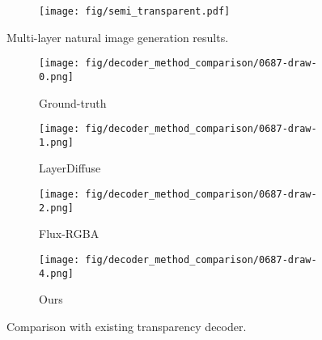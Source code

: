 \begin{figure}[!t]
\begin{minipage}[!t]{1\linewidth}
    \begin{subfigure}[b]{1\textwidth}
    \centering
\texttt{[image: fig/semi\_transparent.pdf]}
\vspace{-2mm}
\end{subfigure}
\vspace{-6mm}
\caption{Multi-layer natural image generation results.}
\label{fig:semi_tran}
\vspace{3mm}
\end{minipage}
\begin{minipage}[!t]{1\linewidth}
\begin{minipage}[!t]{0.25\linewidth}
    \begin{subfigure}[b]{1\textwidth}
    \centering
    \texttt{[image: fig/decoder\_method\_comparison/0687-draw-0.png]}
    \caption{\footnotesize{Ground-truth}}
    \end{subfigure}
\end{minipage}%
\begin{minipage}[!t]{0.25\linewidth}
    \begin{subfigure}[b]{1\textwidth}
    \centering
    \texttt{[image: fig/decoder\_method\_comparison/0687-draw-1.png]}
    \caption{\footnotesize{LayerDiffuse}}
    \end{subfigure}
\end{minipage}%
\begin{minipage}[!t]{0.25\linewidth}
    \begin{subfigure}[b]{1\textwidth}
    \centering
    \texttt{[image: fig/decoder\_method\_comparison/0687-draw-2.png]}
    \caption{\footnotesize{Flux-RGBA}}
    \end{subfigure}
\end{minipage}%
\begin{minipage}[!t]{0.25\linewidth}
    \begin{subfigure}[b]{1\textwidth}
    \centering
    \texttt{[image: fig/decoder\_method\_comparison/0687-draw-4.png]}
    \caption{\footnotesize{Ours}}
    \end{subfigure}
\end{minipage}
\vspace{-3mm}
\caption{\footnotesize{Comparison with existing transparency decoder.}}
\label{fig:sota_decoder_compare}
\vspace{2mm}
\end{minipage}
\vspace{-6mm}
\end{figure}

